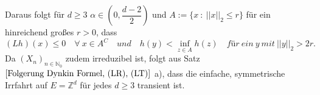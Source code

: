 Daraus folgt für $d \geq 3$ $\alpha \in \left(0,\dfrac{d-2}{2}\right)$ und $A := \lbrace x \: : \: {\vert \vert x \vert \vert}_{2} \leq r \rbrace$ für ein hinreichend großes $r>0$, dass
\begin{equation*}
(Lh)(x) \leq 0 \quad \forall \: x \in A^{C} \quad und \quad h(y) < \inf_{z \in A} h(z) \quad für \: ein \: y \: mit \: {\vert \vert y \vert \vert}_{2} > 2r.
\end{equation*}
Da $(X_{n})_{n \in \mathbb{N}_{0}}$ zudem irreduzibel ist, folgt aus Satz $\ref{Folgerung Dynkin Formel, (LR), (LT)}$ a), dass die einfache, symmetrische Irrfahrt auf $E = \mathbb{Z}^{d}$ für jedes $d \geq 3$ transient ist.